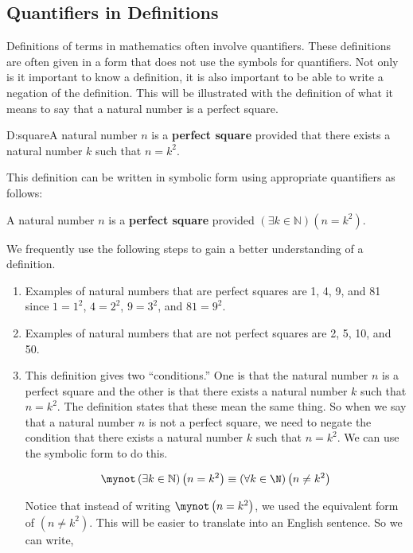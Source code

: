 \subsection*{Quantifiers in Definitions}
%
Definitions of terms in mathematics often involve quantifiers.  These definitions are often given in a form that does not use the symbols for quantifiers.  Not only is it important to  know a definition, it is also important to be able to write a negation of the definition.  This will be illustrated with the definition of what it means to say that a natural number is a perfect square.

%
\begin{defbox}{D:square}{A natural number  $n$  is a \textbf{perfect square}
%
 provided that there exists a natural number  $k$  such that  $n = k^2$.}  
\end{defbox}
%
This definition can be written in symbolic form using appropriate quantifiers as follows:
\begin{center}
A natural number  $n$  is a \textbf{perfect square} provided  $\left( {\exists k \in \mathbb{N}} \right) \! \left( {n = k^2 } \right)$.
\end{center}

We frequently use the following steps to gain a better understanding of a definition.

\begin{enumerate}
  \item Examples of natural numbers that are perfect squares are 1, 4, 9, and 81 since 
$1 = 1^2$, $4 = 2^2$, $9 = 3^2$, and $81 = 9^2$.

  \item Examples of natural numbers that are not perfect squares are 2, 5, 10, and 50.

  \item This definition gives two ``conditions.''  One is that the natural number $n$ is a perfect square and the other is that there exists a natural number $k$ such that $n = k^2$.  The definition states that these mean the same thing.  So when we say that a natural number $n$ is not a perfect square, we need to negate the condition that  there exists a natural number $k$ such that $n = k^2$.  We can use the symbolic form to do this.

\[
\mynot \left( {\exists k \in \mathbb{N}} \right)\left( {n = k^2 } \right) \equiv 
\left( \forall k \in \N \right) \left( n \ne k^2 \right)
\]

Notice that instead of writing $\mynot \left(n = k^2 \right)$, we used the equivalent form of 
$\left(n \ne k^2 \right)$.  This will be easier to translate into an English sentence.  So we can write,

\end{enumerate}


